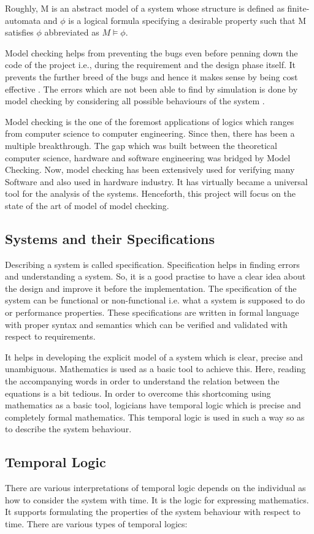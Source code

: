 \documentclass[a4paper,12pt]{extarticle}
\begin{document}
{Roughly, M is an abstract model of a system whose structure is defined as finite-automata and $\phi$  is a logical formula specifying a desirable property such that M satisfies $\phi$  abbreviated as $M \models \phi$. 

Model checking helps from preventing the bugs even before penning down the code of the project i.e., during the requirement and the design phase itself\cite{ErichGamma1995}. It prevents the further breed of the bugs and hence it makes sense by being cost effective \cite{Havelund}. The errors which are not been able to find by simulation is done by model checking by considering all possible behaviours of the system \cite{Havelund}. 

Model checking is the one of the foremost applications of logics which ranges from computer science to computer engineering. Since then, there has been a multiple breakthrough. The gap which was built between the theoretical computer science, hardware and software engineering was bridged by Model Checking. Now, model checking has been extensively used for verifying many Software and also used in hardware industry. It has virtually became a universal tool for the analysis of the systems. Henceforth, this project will focus on the state of the art of model of model checking.
\subsection{Systems and their Specifications}
\label{Sys and Spec}
\onehalfspacing
Describing a system is called specification. Specification helps in finding errors and understanding a system\cite{Wang2007}. So, it is a good practise to have a clear idea about the design and improve it before the implementation\cite{ErichGamma1995}. The specification of the system can be functional or non-functional i.e. what a system is supposed to do or performance properties\cite{Wang2007}. These specifications are written in formal language\cite{D.Jackson} with proper syntax and semantics which can be verified and validated with respect to requirements.

It helps in developing the explicit model of a system which is clear, precise and unambiguous. Mathematics is used as a basic tool to achieve this. Here, reading the accompanying words in order to understand the relation between the equations is a bit tedious. In order to overcome this shortcoming using mathematics as a basic tool, logicians have temporal logic which is precise and completely formal mathematics. This temporal logic is used in such a way so as to describe the system behaviour. 
\subsection{Temporal Logic} 
\label{Temp Logic}
\onehalfspacing
There are various interpretations of temporal logic depends on the individual as how to consider the system with time. It is the logic for expressing mathematics. It supports formulating the properties of the system behaviour with respect to time. There are various types of temporal logics:}
\end{document}
